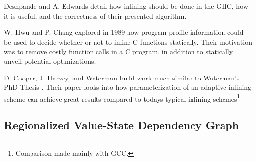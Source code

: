 Deshpande and A. Edwards \cite{deshpande2012statically} detail how inlining
should be done in the GHC, how it is useful, and the correctness of their
presented algorithm.

W. Hwu and P. Chang \cite{InlineFuncExpCProgs} explored in 1989 how program
profile information could be used to decide whether or not to inline C functions
statically. Their motivation was to remove costly function calls in a C
program, in addition to statically unveil potential optimizations.

D. Cooper, J. Harvey, and Waterman \cite{AdaptvStratInlSubst} build work much
similar to Waterman's PhD Thesis \cite{AdaptvCompilAndInlingWaterman}. Their
paper looks into how parameterization of an adaptive inlining scheme can achieve
great results compared to todays typical inlining schemes\footnote{Comparison
made mainly with GCC.}

\subsection{Regionalized Value-State Dependency Graph}
